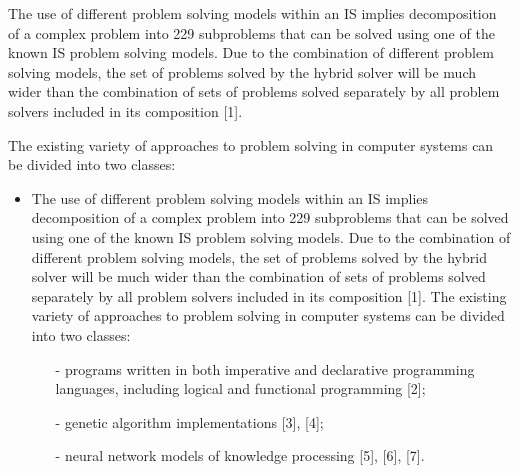\documentclass [11pt, a4paper]{article}
\begin{document}
\begin{multicols}{2}
\begin{itemize}
\end{itemize}
\par \quad The use of different problem solving models within
an IS implies decomposition of a complex problem into
229
subproblems that can be solved using one of the known
IS problem solving models. Due to the combination of
different problem solving models, the set of problems
solved by the hybrid solver will be much wider than the
combination of sets of problems solved separately by all
problem solvers included in its composition [1].
\par \quad The existing variety of approaches to problem solving
in computer systems can be divided into two classes:
\begin{itemize}
    \item The use of different problem solving models within
an IS implies decomposition of a complex problem into
229 subproblems that can be solved using one of the known
IS problem solving models. Due to the combination of
different problem solving models, the set of problems
solved by the hybrid solver will be much wider than the
combination of sets of problems solved separately by all
problem solvers included in its composition [1]. 
The existing variety of approaches to problem solving
in computer systems can be divided into two classes:
\begin{itemize}
    \item[-] programs written in both imperative and declarative programming languages, including logical
and functional programming [2];
 \item[-] genetic algorithm implementations [3], [4];
 \item[-] neural network models of knowledge processing
[5], [6], [7].


\end{itemize}
\end{itemize}
\end{multicols}
\end{document}
